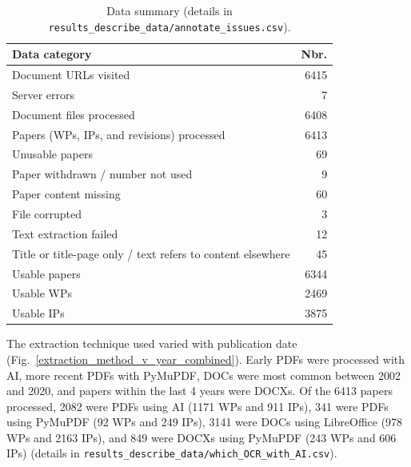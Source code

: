 \documentclass[12pt]{article}
\begin{document}
\begin{table}[h]
    \centering
    \caption{Data summary (details in {\tt results\_describe\_data/annotate\_issues.csv}).}
    \label{data_summary}
    \begin{tabulary}{\textwidth}{LR}
        \toprule
        Data category & Nbr. \\
        \midrule
        Document URLs visited & 6415 \\
        Server errors & 7 \\
        Document files processed & 6408 \\
        Papers (WPs, IPs, and revisions) processed & 6413 \\
        \midrule
        Unusable papers & 69 \\
        \phantom{space} Paper withdrawn / number not used & 9 \\
        \phantom{space} Paper content missing & 60 \\
        \phantom{space space} File corrupted & 3 \\
        \phantom{space space} Text extraction failed & 12 \\
        \phantom{space space} Title or title-page only / text refers to content elsewhere & 45 \\
        \midrule
        Usable papers & 6344 \\
        \phantom{space} Usable WPs & 2469 \\
        \phantom{space} Usable IPs & 3875 \\
        \bottomrule
    \end{tabulary} 
\end{table}


The extraction technique used varied with publication date
(Fig.~\ref{extraction_method_v_year_combined}).
Early PDFs were processed with AI,
more recent PDFs with PyMuPDF,
DOCs were most common between 2002 and 2020,
and papers within the last 4 years were DOCXs.
Of the 6413 papers processed, 
2082 were PDFs using AI (1171 WPs and 911 IPs),
341 were PDFs using PyMuPDF (92 WPs and 249 IPs),
3141 were DOCs using LibreOffice (978 WPs and 2163 IPs),
and 849 were DOCXs using PyMuPDF (243 WPs and 606 IPs)
(details in {\tt results\_describe\_data/which\_OCR\_with\_AI.csv}).
\end{document}
